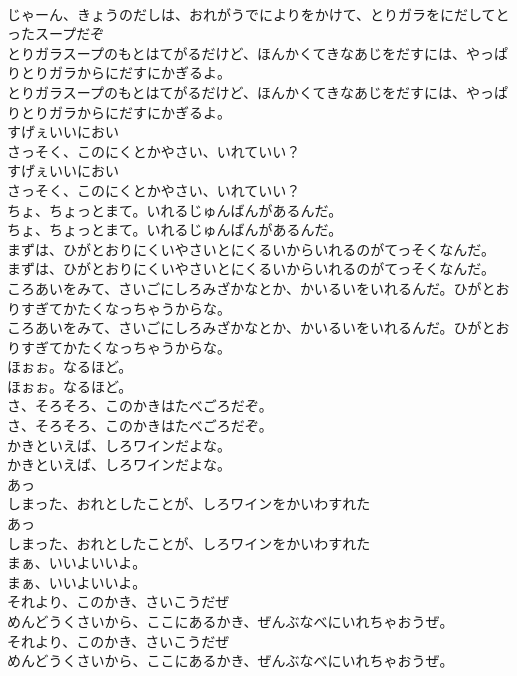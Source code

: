 \documentclass[8pt]{extreport}
\begin{document}
\begin{CJK}{UTF8}{min}
\\	じゃーん、きょうのだしは、おれがうでによりをかけて、とりガラをにだしてとったスープだぞ
\\	とりガラスープのもとはてがるだけど、ほんかくてきなあじをだすには、やっぱりとりガラからにだすにかぎるよ。
\\	とりガラスープのもとはてがるだけど、ほんかくてきなあじをだすには、やっぱりとりガラからにだすにかぎるよ。
\\	すげぇいいにおい
\\	さっそく、このにくとかやさい、いれていい？
\\	すげぇいいにおい
\\	さっそく、このにくとかやさい、いれていい？
\\	ちょ、ちょっとまて。いれるじゅんばんがあるんだ。
\\	ちょ、ちょっとまて。いれるじゅんばんがあるんだ。
\\	まずは、ひがとおりにくいやさいとにくるいからいれるのがてっそくなんだ。
\\	まずは、ひがとおりにくいやさいとにくるいからいれるのがてっそくなんだ。
\\	ころあいをみて、さいごにしろみざかなとか、かいるいをいれるんだ。ひがとおりすぎてかたくなっちゃうからな。
\\	ころあいをみて、さいごにしろみざかなとか、かいるいをいれるんだ。ひがとおりすぎてかたくなっちゃうからな。
\\	ほぉぉ。なるほど。
\\	ほぉぉ。なるほど。
\\	さ、そろそろ、このかきはたべごろだぞ。
\\	さ、そろそろ、このかきはたべごろだぞ。
\\	かきといえば、しろワインだよな。
\\	かきといえば、しろワインだよな。
\\	あっ
\\	しまった、おれとしたことが、しろワインをかいわすれた
\\	あっ
\\	しまった、おれとしたことが、しろワインをかいわすれた
\\	まぁ、いいよいいよ。
\\	まぁ、いいよいいよ。
\\	それより、このかき、さいこうだぜ
\\	めんどうくさいから、ここにあるかき、ぜんぶなべにいれちゃおうぜ。
\\	それより、このかき、さいこうだぜ
\\	めんどうくさいから、ここにあるかき、ぜんぶなべにいれちゃおうぜ。

\end{CJK}
\end{document}
